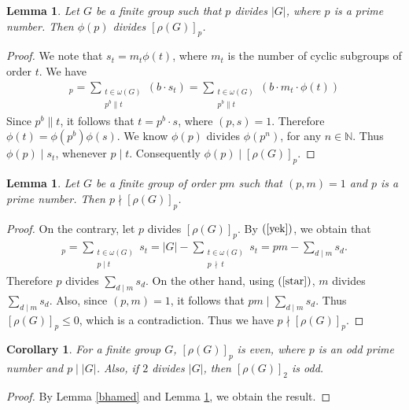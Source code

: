 \documentclass[12pt]{amsart}
\newtheorem{corollary}[theorem]{Corollary}
\newtheorem{lemma}[theorem]{Lemma}
\theoremstyle{definition}
\begin{document}
	\begin{lemma} \label{bbhamed}  
		Let $G$ be a finite group such that $p$ divides $| G |$, where $p$ is a  prime  number. Then
		$\phi(p) $ divides  $ [\rho(G)]_p$.
	\end{lemma}
	\begin{proof}	
		We note
		that $s_t = m_t \phi(t)$, where $m_t$ is the number of cyclic subgroups of order $t$.
		We  have
		\begin{align*}
			[\rho(G)]_p=\sum_{ \substack{ t \in \omega(G) \\ p^b \| t}} \left(b \cdot s_t\right)  =\sum_{ \substack{ t \in \omega(G) \\ p^b \| t}}
		\left(b \cdot m_t \cdot \phi(t)\right)
		\end{align*}
	Since $p^b \| t$, it follows that $ t=p^b \cdot s $, where $(p,s)=1$.
		Therefore $\phi(t)= \phi(p^b) \phi(s)$. 
		We know $\phi(p) $ divides $ \phi(p^n)$, for any $n \in \mathbb{N}$.  Thus $\phi(p) \mid s_t$, whenever  $p \mid t$.
		Consequently   $\phi(p) \mid [\rho(G)]_p$.
	\end{proof}
	\begin{lemma} \label{bbbhamed}  
		Let $G$ be a finite group of order $pm$ such that  $(p,m)=1$ and $p$ is a  prime  number. Then
		$p \nmid [\rho(G)]_p$.
	\end{lemma}
	\begin{proof}
		On the contrary, let $p $ divides $ [\rho(G)]_p$.
		By $(\ref{yek})$, we  obtain that
		\begin{align*}
			[\rho(G)]_p=\sum_{ \substack{ t \in \omega(G) \\ p \mid t}}s_t  = |G|-\sum_{ \substack{ t \in \omega(G) \\ p\,  \nmid \,t }}s_t  
			= pm - \sum_{d \mid m} s_d.
		\end{align*}
		Therefore $p $ divides $ \sum_{d \mid m} s_d$. 
		On the other hand, using  $(\ref{star})$, $m$ divides $\sum_{d \mid m} s_d$. 
	Also,	since $(p,m)=1$, it follows that   $pm \mid \sum_{d \mid m} s_d$. Thus $[\rho(G)]_p\leq0$, which is a contradiction. Thus we have  $p \nmid [\rho(G)]_p$.
	\end{proof}
	\begin{corollary}\label{2-part}
		For a finite group $G$,  $[\rho(G)]_p$ is even, where $p$ is an odd prime number and $p \mid |G|$. 
		Also, if $2 $ divides $|G|$, then $[\rho(G)]_2$ is odd.
	\end{corollary}
\begin{proof}
 By Lemma \ref{bhamed} and Lemma \ref{bbhamed}, we obtain  the result.
\end{proof}
\end{document}
